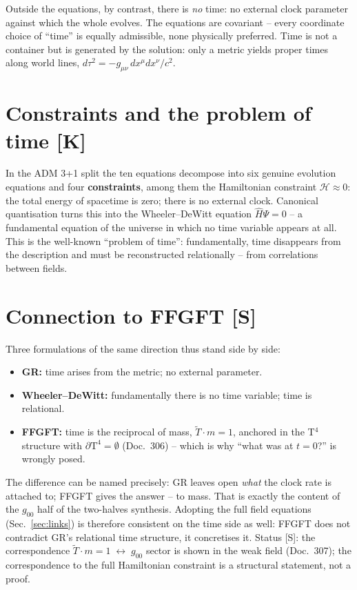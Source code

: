 \documentclass[11pt]{report}
\begin{document}
Outside the equations, by contrast, there is \emph{no} time: no
external clock parameter against which the whole evolves. The
equations are covariant -- every coordinate choice of
\enquote{time} is equally admissible, none physically preferred.
Time is not a container but is generated by the solution: only a
metric yields proper times along world lines,
$d\tau^2 = -g_{\mu\nu}\,dx^\mu dx^\nu/c^2$.

\section{Constraints and the problem of time [K]}

In the ADM 3+1 split the ten equations decompose into six genuine
evolution equations and four \textbf{constraints}, among them the
Hamiltonian constraint $\mathcal{H} \approx 0$: the total energy of
spacetime is zero; there is no external clock. Canonical
quantisation turns this into the Wheeler--DeWitt equation
$\hat{H}\Psi = 0$ -- a fundamental equation of the universe in
which no time variable appears at all. This is the well-known
\enquote{problem of time}: fundamentally, time disappears from the
description and must be reconstructed relationally -- from
correlations between fields.

\section{Connection to FFGFT [S]}

Three formulations of the same direction thus stand side by side:

\begin{itemize}
  \item \textbf{GR:} time arises from the metric; no external
        parameter.
  \item \textbf{Wheeler--DeWitt:} fundamentally there is no time
        variable; time is relational.
  \item \textbf{FFGFT:} time is the reciprocal of mass,
        $\tilde T \cdot m = 1$, anchored in the T$^4$ structure with
        $\partial\text{T}^4 = \emptyset$ (Doc.~306) -- which is why
        \enquote{what was at $t=0$?} is wrongly posed.
\end{itemize}

The difference can be named precisely: GR leaves open \emph{what}
the clock rate is attached to; FFGFT gives the answer -- to mass.
That is exactly the content of the $g_{00}$ half of the two-halves
synthesis. Adopting the full field equations (Sec.~\ref{sec:links}) is therefore
consistent on the time side as well: FFGFT does not contradict GR's
relational time structure, it concretises it. Status [S]: the
correspondence $\tilde T \cdot m = 1 \;\leftrightarrow\; g_{00}$
sector is shown in the weak field (Doc.~307); the correspondence to
the full Hamiltonian constraint is a structural statement, not a
proof.
\end{document}
